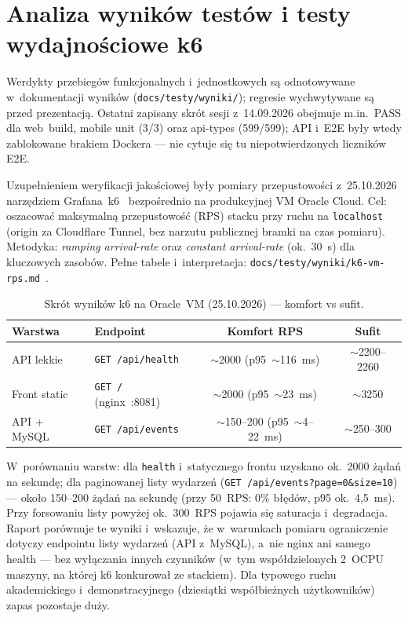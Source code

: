 \documentclass{sprz}
\begin{document}
\section{Analiza wyników testów i testy wydajnościowe k6}
Werdykty przebiegów funkcjonalnych i~jednostkowych są odnotowywane w~dokumentacji wyników (\texttt{docs/\allowbreak testy/\allowbreak wyniki/}); regresie wychwytywane są przed prezentacją. Ostatni zapisany skrót sesji z~14.09.2026 obejmuje m.in.\ PASS dla web~build, mobile unit (3/3) oraz api-types (599/599); API i~E2E były wtedy zablokowane brakiem Dockera --- nie cytuje się tu niepotwierdzonych liczników E2E.

Uzupełnieniem weryfikacji jakościowej były pomiary przepustowości z~25.10.2026 narzędziem Grafana~k6~\cite{k6:docs} bezpośrednio na produkcyjnej VM Oracle Cloud. Cel: oszacować maksymalną przepustowość (RPS) stacku przy ruchu na \texttt{localhost} (origin za Cloudflare Tunnel, bez narzutu publicznej bramki na czas pomiaru). Metodyka: \emph{ramping arrival-rate} oraz \emph{constant arrival-rate} (ok.\ 30~s) dla kluczowych zasobów. Pełne tabele i~interpretacja: \texttt{docs/\allowbreak testy/\allowbreak wyniki/\allowbreak k6-vm-rps.md}~\cite{k6:vm-rps}.

\begin{table}[ht]
  \centering
  \caption{Skrót wyników k6 na Oracle~VM (25.10.2026) --- komfort vs sufit.}
  \label{tab:k6-rps}
  {\footnotesize
  \renewcommand{\arraystretch}{1.05}
  \begin{tabularx}{\linewidth}{|>{\raggedright\arraybackslash}X|>{\raggedright\arraybackslash}X|>{\raggedright\arraybackslash}c|>{\raggedright\arraybackslash}c|}
    \hline
    \textbf{Warstwa} & \textbf{Endpoint} & \textbf{Komfort RPS} & \textbf{Sufit} \\
    \hline
    API lekkie & \texttt{GET /api/health} & $\sim$2000 (p95~$\sim$116~ms) & $\sim$2200--2260 \\
    \hline
    Front static & \texttt{GET /} (nginx~:8081) & $\sim$2000 (p95~$\sim$23~ms) & $\sim$3250 \\
    \hline
    API + MySQL & \texttt{GET /api/events} & $\sim$150--200 (p95~$\sim$4--22~ms) & $\sim$250--300 \\
    \hline
  \end{tabularx}
  }
\end{table}

W~porównaniu warstw: dla \texttt{health} i~statycznego frontu uzyskano ok.\ 2000 żądań na sekundę; dla paginowanej listy wydarzeń (\texttt{GET /api/events?page=0\&size=10}) --- około 150--200 żądań na sekundę (przy 50~RPS: 0\% błędów, p95 ok.\ 4{,}5~ms). Przy forsowaniu listy powyżej ok.\ 300~RPS pojawia się saturacja i~degradacja. Raport porównuje te wyniki i~wskazuje, że w~warunkach pomiaru ograniczenie dotyczy endpointu listy wydarzeń (API z~MySQL), a~nie nginx ani samego health --- bez wyłączania innych czynników (w~tym współdzielonych 2~OCPU maszyny, na której k6 konkurował ze stackiem). Dla typowego ruchu akademickiego i~demonstracyjnego (dziesiątki współbieżnych użytkowników) zapas pozostaje duży.
\end{document}
